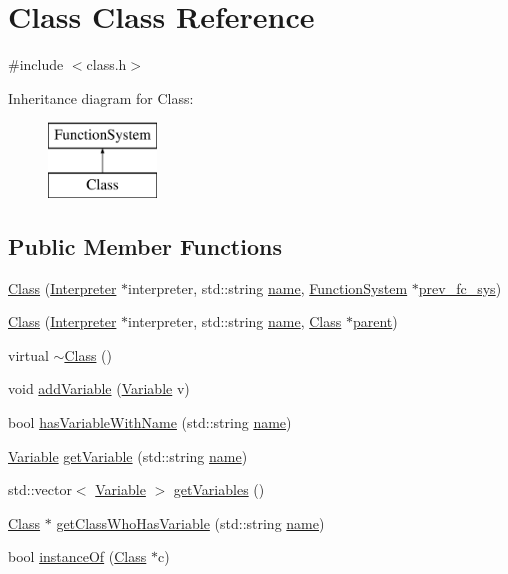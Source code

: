 \hypertarget{classClass}{}\section{Class Class Reference}
\label{classClass}


{\ttfamily \#include $<$class.\+h$>$}

Inheritance diagram for Class\+:\begin{figure}[H]
\begin{center}
\leavevmode
\includegraphics[height=2.000000cm]{classClass}
\end{center}
\end{figure}
\subsection*{Public Member Functions}
\begin{DoxyCompactItemize}
\item 
\hyperlink{classClass_a7682a59beaae0b8ce1070af8b9dcb534}{Class} (\hyperlink{classInterpreter}{Interpreter} $\ast$interpreter, std\+::string \hyperlink{classClass_aac209ee2e03afc3bc9e93fd1fd46256b}{name}, \hyperlink{classFunctionSystem}{Function\+System} $\ast$\hyperlink{classFunctionSystem_a0d223ca42b6d6617af61136bdb1f33dd}{prev\+\_\+fc\+\_\+sys})
\item 
\hyperlink{classClass_a56aabf11831a180f94fe047d4af4ccb5}{Class} (\hyperlink{classInterpreter}{Interpreter} $\ast$interpreter, std\+::string \hyperlink{classClass_aac209ee2e03afc3bc9e93fd1fd46256b}{name}, \hyperlink{classClass}{Class} $\ast$\hyperlink{classClass_a1f94bc39c04d18b5c4421862f8506d1d}{parent})
\item 
virtual \hyperlink{classClass_aa3b9e4e0df41778f3d26777c1eb62898}{$\sim$\+Class} ()
\item 
void \hyperlink{classClass_a0c10b6fc7440f229da43f013271c0506}{add\+Variable} (\hyperlink{classVariable}{Variable} v)
\item 
bool \hyperlink{classClass_a0c5ffb0b7e3e95dedad01b8b4e91d93b}{has\+Variable\+With\+Name} (std\+::string \hyperlink{classClass_aac209ee2e03afc3bc9e93fd1fd46256b}{name})
\item 
\hyperlink{classVariable}{Variable} \hyperlink{classClass_a5c5de4f3c1419dedc92fc3d982fc6f65}{get\+Variable} (std\+::string \hyperlink{classClass_aac209ee2e03afc3bc9e93fd1fd46256b}{name})
\item 
std\+::vector$<$ \hyperlink{classVariable}{Variable} $>$ \hyperlink{classClass_ab24282751aa8b0ba2b2c71fbd3eef7e5}{get\+Variables} ()
\item 
\hyperlink{classClass}{Class} $\ast$ \hyperlink{classClass_aec836433f28bcfb9bf013ce79f24ba23}{get\+Class\+Who\+Has\+Variable} (std\+::string \hyperlink{classClass_aac209ee2e03afc3bc9e93fd1fd46256b}{name})
\item 
bool \hyperlink{classClass_a9bbffa241c269033a12c76f85af9c5ac}{instance\+Of} (\hyperlink{classClass}{Class} $\ast$c)
\end{DoxyCompactItemize}
